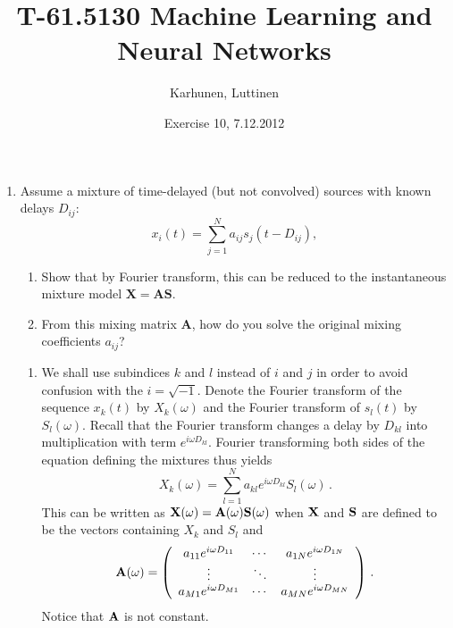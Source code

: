 
\title{T-61.5130 Machine Learning and Neural Networks}
\author{Karhunen, Luttinen}
\date{Exercise 10, 7.12.2012}

\newcommand{\vect}[1]{{\bf{#1}}}
\newcommand{\svect}[1]{\boldsymbol{#1}}
\newcommand{\matr}[1]{\boldsymbol{#1}}




\maketitle

\begin{enumerate}


\item Assume a mixture of time-delayed (but not convolved) sources with known delays $D_{ij}$:
  \begin{displaymath}
    x_i(t) = \sum_{j=1}^N a_{ij}s_j(t-D_{ij}),
  \end{displaymath}
  \begin{enumerate}
  \item Show that by Fourier transform, this can be reduced to the instantaneous mixture
    model $\mathbf{X} = \mathbf{A} \mathbf{S}$.
  \item From this mixing matrix $\mathbf{A}$, how do you solve the original mixing
    coefficients $a_{ij}$?
  \end{enumerate}

  \begin{solution}


    \begin{enumerate}
    \item We shall use subindices $k$ and $l$ instead of $i$ and $j$ in
      order to avoid confusion with the $i = \sqrt{-1}$.  Denote the
      Fourier transform of the sequence $x_k(t)$ by $X_k(\omega)$ and
      the Fourier transform of $s_l(t)$ by $S_l(\omega)$.  Recall that
      the Fourier transform changes a delay by $D_{kl}$ into
      multiplication with term $e^{i\omega D_{kl}}$.  Fourier
      transforming both sides of the equation defining the mixtures thus
      yields $$X_k(\omega) = \sum_{l=1}^N a_{kl} e^{i\omega D_{kl}}
      S_l(\omega) \, .$$ This can be written as $\bf{X}(\omega) =
      \bf{A}(\omega) \bf{S}(\omega)$ when $\bf{X}$ and $\bf{S}$ are
      defined to be the vectors containing $X_k$ and $S_l$ and
      \[
      \bf{A}(\omega) = \left( \begin{array}{ccc} a_{11}e^{i\omega
            D_{11}} & \cdots & a_{1N}e^{i\omega D_{1N}} \\ \vdots & \ddots &
          \vdots \\ a_{M1}e^{i\omega D_{M1}} & \cdots & a_{MN}e^{i\omega
            D_{MN}} \end{array} \right) \, .
      \] Notice that ${\bf A}$ is not
      constant.


\end{enumerate}
\end{solution}
\end{enumerate}
